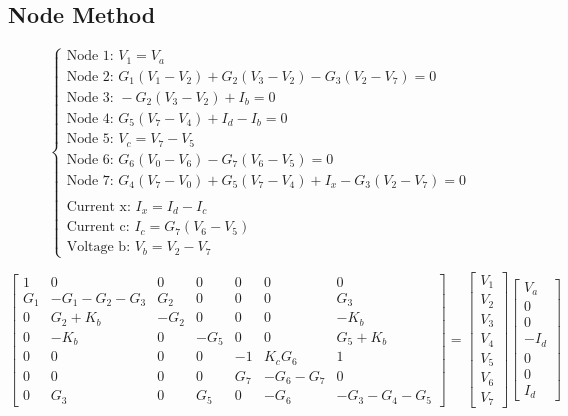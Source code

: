 \subsection{Node Method}
\label{subsec:Node Method}

$$
\begin{cases}
  \text{Node 1: } V_{1} = V_{a}\\
  \text{Node 2: } G_{1}(V_{1}-V_{2})+G_{2}(V_{3}-V_{2})-G_{3}(V_{2}-V_{7}) = 0\\
  \text{Node 3: } -G_{2}(V_{3}-V_{2})+I_{b} = 0\\
  \text{Node 4: } G_{5}(V_{7}-V_{4})+I_{d}-I_{b} = 0\\
  \text{Node 5: } V_{c}=V_{7}-V_{5}\\
  \text{Node 6: } G_{6}(V_{0}-V_{6})-G_{7}(V_{6}-V_{5}) = 0\\
  \text{Node 7: } G_{4}(V_{7}-V_{0})+G_{5}(V_{7}-V_{4})+I_{x}-G_{3}(V_{2}-V_{7}) = 0\\
  \\
  \text{Current x: } I_{x} = I_{d}-I_{c}\\
  \text{Current c: } I_{c} = G_{7}(V_{6}-V_{5})\\
  \text{Voltage b: } V_{b} = V_{2}-V_{7}
\end{cases}
$$

$$
\begin{bmatrix}
  1 & 0 & 0 & 0 & 0 & 0 & 0\\
  G_{1} & -G_{1}-G_{2}-G_{3} & G_{2} & 0 & 0 & 0 & G_{3}\\
  0 & G_{2}+K_{b} & -G_{2} & 0 & 0 & 0 & -K_{b}\\
  0 & -K_{b} & 0 & -G_{5} & 0 & 0 & G_{5}+K_{b}\\
  0 & 0 & 0 & 0 & -1 & K_{c}G_{6} & 1\\
  0 & 0 & 0 & 0 & G_{7} & -G_{6}-G_{7} & 0\\
  0 & G_{3} & 0 & G_{5} & 0 & -G_{6} & -G_{3}-G_{4}-G_{5}
\end{bmatrix}
=
\begin{bmatrix}
  V_{1}\\
  V_{2}\\
  V_{3}\\
  V_{4}\\
  V_{5}\\
  V_{6}\\
  V_{7}
\end{bmatrix}
\begin{bmatrix}
  V_{a}\\
  0\\
  0\\
  -I_{d}\\
  0\\
  0\\
  I_{d}
\end{bmatrix}
$$


